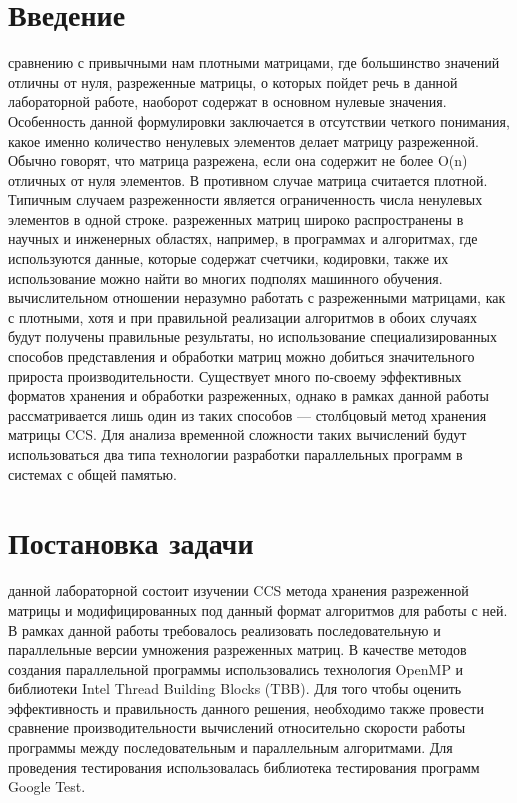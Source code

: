 \documentclass{report}
\begin{document}
\setcounter{page}{2}
\tableofcontents
\newpage

\section*{Введение}
 сравнению с привычными нам плотными матрицами, где большинство значений отличны от нуля, разреженные матрицы, о которых пойдет речь в данной лабораторной работе, наоборот содержат в основном нулевые значения. Особенность данной формулировки заключается в отсутствии четкого понимания, какое именно количество ненулевых элементов делает матрицу разреженной. Обычно говорят, что матрица разрежена, если она содержит не более O(n) отличных от нуля элементов. В противном случае матрица считается плотной. Типичным случаем разреженности является ограниченность числа ненулевых элементов в одной строке.
 разреженных матриц широко распространены в научных и инженерных областях, например, в программах и алгоритмах, где используются данные, которые содержат счетчики, кодировки, также их использование можно найти во многих подполях машинного обучения.
 вычислительном отношении неразумно работать с разреженными матрицами, как с плотными, хотя и при правильной реализации алгоритмов в обоих случаях будут получены правильные результаты, но использование специализированных способов представления и обработки матриц можно добиться значительного прироста производительности. Существует много по-своему эффективных форматов хранения и обработки разреженных, однако в рамках данной работы рассматривается лишь один из таких способов — столбцовый метод хранения матрицы CCS. Для анализа временной сложности таких вычислений будут использоваться два типа технологии разработки параллельных программ в системах с общей памятью.
\newpage

\section*{Постановка задачи}
 данной лабораторной состоит изучении CCS метода хранения разреженной матрицы и модифицированных под данный формат алгоритмов для работы с ней. В рамках данной работы требовалось реализовать последовательную и параллельные версии умножения разреженных матриц. В качестве методов создания параллельной программы использовались технология OpenMP и библиотеки Intel Thread Building Blocks (TBB). Для того чтобы оценить эффективность и правильность данного решения, необходимо также провести сравнение производительности вычислений относительно скорости работы программы между последовательным и параллельным алгоритмами. Для  проведения тестирования использовалась библиотека тестирования программ Google Test.
\newpage
\end{document}
